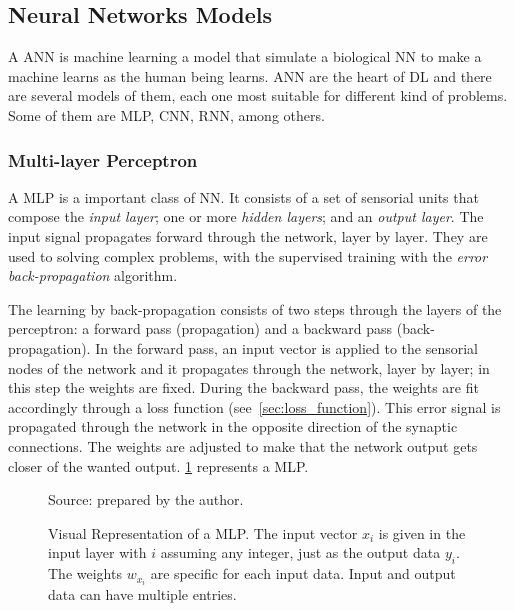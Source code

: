 \subsection{Neural Networks Models}\label{sec:nn_models}

A ANN is machine learning a model that simulate a biological NN to make a machine learns as the human being learns.
ANN are the heart of DL and there are several models of them, each one most suitable for different kind of problems.
Some of them are MLP, CNN, RNN, among others.

\subsubsection*{Multi-layer Perceptron}

A MLP is a important class of NN. It consists of a set of sensorial units that compose the \emph{input layer}; one or more \emph{hidden layers}; and an \emph{output layer}. 
The input signal propagates forward through the network, layer by layer. 
They are used to solving complex problems, with the supervised training with the \emph{error back-propagation} algorithm.

The learning by back-propagation consists of two steps through the layers of the perceptron: a forward pass (propagation) and a backward pass (back-propagation). 
In the forward pass, an input vector is applied to the sensorial nodes of the network and it propagates through the network, layer by layer; in this step the weights are fixed. 
During the backward pass, the weights are fit accordingly through a loss function (see~\cref{sec:loss_function}). 
This error signal is propagated through the network in the opposite direction of the synaptic connections. 
The weights are adjusted to make that the network output gets closer of the wanted output. 
\cref{fig:mlp} represents a MLP.

\begin{figure}[!htb]
    \centering
    \caption[Visual Representation of a MLP]{Visual Representation of a MLP. The input vector \(x_i\) is given in the input layer with \(i\) assuming any integer, just as the output data \(y_i\). The weights \(w_{x_i}\) are specific for each input data. Input and output data can have multiple entries.}
    
    
    {\footnotesize Source: prepared by the author.}
    \label{fig:mlp}
\end{figure}

